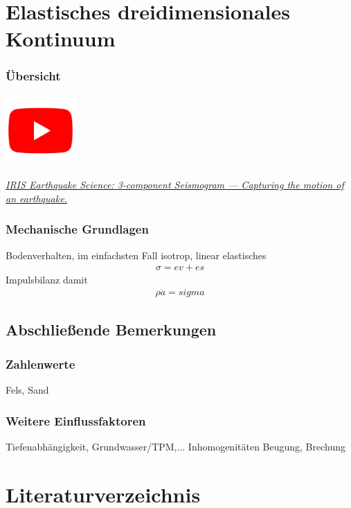 \documentclass[hyperref={pdfpagemode=FullScreen, colorlinks=false}]{beamer}
\begin{document}
\maketitle

\section{Elastisches dreidimensionales Kontinuum}

\begin{frame}
\frametitle{Übersicht}
\begin{center}
\includegraphics[width=0.2\textwidth]{fig_img/youtube.png}   
\end{center}

\href{https://www.youtube.com/watch?v=Za_22xo7ZQQ}{\textsl{IRIS Earthquake Science: 3-component Seismogram --- Capturing the motion of an earthquake.}}

\end{frame}

\begin{frame}
\frametitle{Mechanische Grundlagen}
Bodenverhalten, im einfachsten Fall isotrop, linear elastisches
\begin{align*}
 \sigma = ev + es
\end{align*}
Impulsbilanz damit
\begin{align*}
 \rho \ddot{a} =sigma
\end{align*}


\end{frame}






\subsection{Abschließende Bemerkungen}
\begin{frame}
\frametitle{Zahlenwerte}
Fels, Sand
\end{frame}


\begin{frame}
\frametitle{Weitere Einflussfaktoren}
Tiefenabhängigkeit, Grundwasser/TPM,...
Inhomogenitäten
Beugung, Brechung
\end{frame}




\section*{Literaturverzeichnis}

\begin{frame}[allowframebreaks]{}
	\printbibliography
\end{frame}
\end{document}
